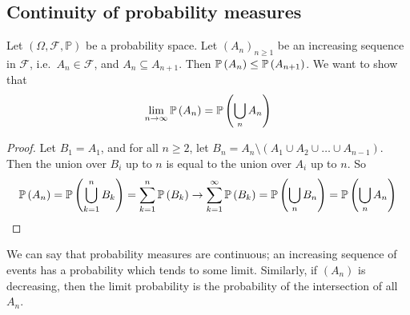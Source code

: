 \subsection{Continuity of probability measures}
Let \((\Omega, \mathcal F, \mathbb P)\) be a probability space.
Let \((A_n)_{n \geq 1}\) be an increasing sequence in \(\mathcal F\), i.e.\ \(A_n \in \mathcal F\), and \(A_n \subseteq A_{n+1}\).
Then \(\mathbb{P}\left({A_n}\right) \leq \mathbb{P}\left({A_{n+1}}\right)\).
We want to show that
\[
	\lim_{n \to \infty}\mathbb{P}\left({A_n}\right) = \mathbb{P}\left({\bigcup_n A_n}\right)
\]
\begin{proof}
	Let \(B_1 = A_1\), and for all \(n \geq 2\), let \(B_n = A_n \setminus (A_1 \cup A_2 \cup \dots \cup A_{n-1})\).
	Then the union over \(B_i\) up to \(n\) is equal to the union over \(A_i\) up to \(n\).
	So
	\[
		\mathbb{P}\left({A_n}\right) = \mathbb{P}\left({\bigcup_{k=1}^n B_k}\right) = \sum_{k=1}^n \mathbb{P}\left({B_k}\right) \to \sum_{k=1}^\infty \mathbb{P}\left({B_k}\right) = \mathbb{P}\left({\bigcup_n B_n}\right) = \mathbb{P}\left({\bigcup_n A_n}\right)
	\]
\end{proof}
\noindent We can say that probability measures are continuous; an increasing sequence of events has a probability which tends to some limit.
Similarly, if \((A_n)\) is decreasing, then the limit probability is the probability of the intersection of all \(A_n\).
